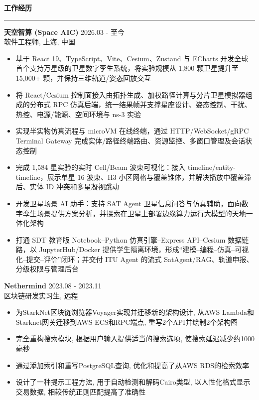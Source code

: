 \documentclass[10pt,a4paper]{article}
\begin{document}
\noindent\textbf{工作经历}\\[-0.2em]
\rule{\textwidth}{1pt}
\textbf{天空智算 (Space AIC)} \hfill 2026.03 - 至今\\
软件工程师, 上海, 中国\vspace{-8pt}
\begin{itemize}[noitemsep,leftmargin = 15pt]
    \item 基于 React 19、TypeScript、Vite、Cesium、Zustand 与 ECharts 开发全球首个支持万星级的卫星数字孪生系统，将实验规模从 1,800 颗卫星提升至 15,000+ 颗，并保持三维轨道/姿态回放交互
    \item 将 React/Cesium 控制面接入由拓扑生成、加权路径计算与分片卫星模拟器组成的分布式 RPC 仿真后端，统一结果帧并支撑星座设计、姿态控制、干扰、热控、电源/能源、空间环境与 ns-3 实验
    \item 实现半实物仿真流程与 microVM 在线终端，通过 HTTP/WebSocket/gRPC Terminal Gateway 完成实体/路径终端路由、资源监控、多窗口管理及会话状态控制
    \item 完成 1,584 星实验的实时 Cell/Beam 波束可视化：接入 timeline/entity-timeline，展示单星 16 波束、H3 小区网格与覆盖锥体，并解决播放中覆盖滞后、实体 ID 冲突和多星凝视跳动
    \item 开发卫星场景 AI 助手：支持 SAT Agent 卫星信息问答与仿真辅助，面向数字孪生场景提供方案分析，并探索在卫星上部署边缘算力运行大模型的天地一体化架构
    \item 打通 SDT 教育版 Notebook--Python 仿真引擎--Express API--Cesium 数据链路，以 JupyterHub/Docker 提供学生隔离环境，形成“建模--编程--仿真--可视化--提交--评价”闭环；并交付 ITU Agent 的流式 SatAgent/RAG、轨道申报、分级权限与管理后台
\end{itemize}

\textbf{Nethermind} \hfill 2023.08 - 2023.11\\
区块链研发实习生, 远程\vspace{-8pt}
\begin{itemize}[noitemsep,leftmargin = 15pt]
    \item 为StarkNet区块链浏览器Voyager实现并迁移新的架构设计, 从AWS Lambda和Starknet网关迁移到AWS ECS和RPC端点, 重写2个API并绘制2个架构图
    \item 完全重构搜索模块, 根据用户输入提供适当的搜索选项, 使搜索延迟减少约1000毫秒
    \item 通过添加索引和重写PostgreSQL查询, 优化和提高了从AWS RDS的检索效率
    \item 设计了一种提示工程方法, 用于自动检测和解码Cairo类型, 以人性化格式显示交易数据, 相较传统正则匹配提高了准确性
\end{itemize}
\end{document}
